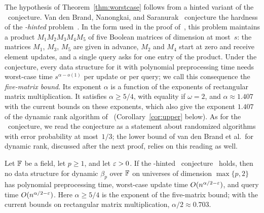 The hypothesis of Theorem~\ref{thm:worstcase} follows from a hinted variant of the \OMv\ conjecture.
Van den Brand, Nanongkai, and Saranurak~\cite[Conjecture~5.12]{vdBNS19full} conjecture the hardness of the \emph{\uMv-hinted \uMv} problem~\cite[Definition~5.11]{vdBNS19full}.
In the form used in the proof of~\cite[Theorem~5.13]{vdBNS19full}, this problem maintains a product $M_1M_2M_3M_4M_5$ of five Boolean matrices of dimension at most~$s$: the matrices $M_1$, $M_3$, $M_5$ are given in advance, $M_2$ and $M_4$ start at zero and receive element updates, and a single query asks for one entry of the product.
Under the conjecture, every data structure for it with polynomial preprocessing time needs worst-case time $s^{\alpha-o(1)}$ per update or per query; we call this consequence the \emph{five-matrix bound}.
Its exponent $\alpha$ is a function of the exponents of rectangular matrix multiplication.
It satisfies $\alpha\ge5/4$, with equality if $\omega=2$, and $\alpha\approx1.407$ with the current bounds on these exponents, which also give the exponent $1.407$ of the dynamic rank algorithm of~\cite{vdBNS19} (Corollary~\ref{cor:upper} below).
As for the \OMv\ conjecture, we read the conjecture as a statement about randomized algorithms with error probability at most~$1/3$; the lower bound of van den Brand et al.\ for dynamic rank, discussed after the next proof, relies on this reading as well.

\begin{corollary}\label{cor:hinted}
Let $\mathbb{F}$ be a field, let $p\ge1$, and let $\varepsilon>0$.
If the \uMv-hinted \uMv\ conjecture~\cite[Conjecture~5.12]{vdBNS19full} holds, then no data structure for dynamic $\beta_p$ over $\mathbb{F}$ on universes of dimension $\max\{p,2\}$ has polynomial preprocessing time, worst-case update time $O(n^{\alpha/2-\varepsilon})$, and query time $O(n^{\alpha/2-\varepsilon})$.
Here $\alpha\ge5/4$ is the exponent of the five-matrix bound; with the current bounds on rectangular matrix multiplication, $\alpha/2\approx0.703$.
\end{corollary}


